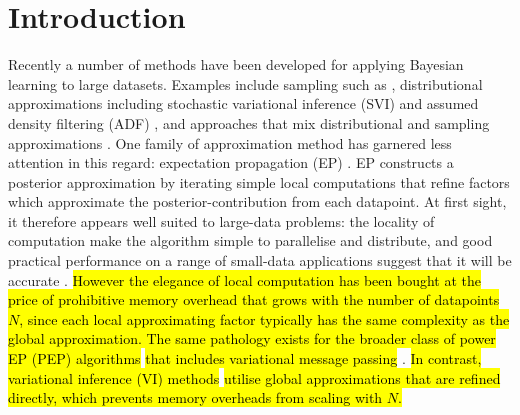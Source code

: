 \section{Introduction}


Recently a number of methods have been developed for applying Bayesian learning to large datasets. Examples include sampling such as \cite{ahn:distributedMCMC, bardenet:MCMC}, distributional approximations including stochastic variational inference (SVI) \cite{hoffman:svi} and assumed density filtering (ADF) \cite{miguel:pbp}, and approaches that mix distributional and sampling approximations \cite{gelman:dep,xu:sms}. 
%
One family of approximation method has garnered less attention in this regard: expectation propagation (EP) \cite{minka:ep, opper:ec}. EP constructs a posterior approximation by iterating simple local computations that refine factors which approximate the posterior-contribution from each datapoint. At first sight, it therefore appears well suited to large-data problems: the locality of computation make the algorithm simple to parallelise and distribute, and good practical performance on a range of small-data applications suggest that it will be accurate \cite{kuss:gpep,barthelme:ep_likelihood,cunningham:gaussianEP}. 
%
\hl{However the elegance of local computation has been bought at the price of prohibitive memory overhead that grows with the number of datapoints $N$, since each local approximating factor typically has the same complexity as the global approximation. The same pathology exists for the broader class of power EP (PEP) algorithms } \cite{minka:powerep} \hl{that includes variational message passing} \cite{winn:vmp}. \hl{In contrast, variational inference (VI) methods} \cite{jordan:variational,beal:variational} \hl{utilise global approximations that are refined directly, which prevents memory overheads from scaling with $N$. }


